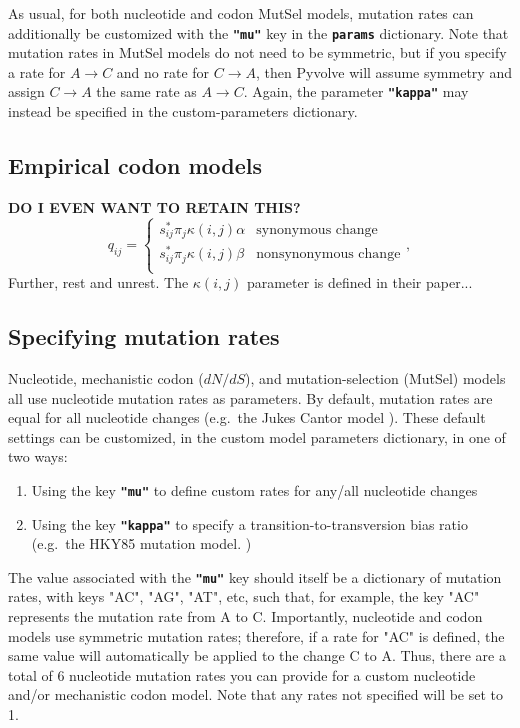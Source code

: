 \documentclass{article}
\newcommand{\code}[1]{\textbf{\texttt{\small{#1}}}}
\begin{document}
As usual, for both nucleotide and codon MutSel models, mutation rates can additionally be customized with the \code{"mu"} key in the \code{params} dictionary. Note that mutation rates in MutSel models do not need to be symmetric, but if you specify a rate for $A \rightarrow C$ and no rate for $C \rightarrow A$, then Pyvolve will assume symmetry and assign $C \rightarrow A$ the same rate as $A \rightarrow C$. Again, the parameter \code{"kappa"} may instead be specified in the custom-parameters dictionary.


\subsection{Empirical codon models}\label{sec:ecm_basic}
\textbf{DO I EVEN WANT TO RETAIN THIS?}
\begin{equation}\label{eq:ecmrest}
q_{ij} = \left\{ 
\begin{array}{rl}
s^\ast_{ij} \pi_j \kappa(i,j) \alpha      &\text{synonymous change} \\
s^\ast_{ij} \pi_j \kappa(i,j) \beta       &\text{nonsynonymous change} \\
\end{array} \right.,
\end{equation}
Further, rest and unrest. The $\kappa(i,j)$ parameter is defined in their paper...

\subsection{Specifying mutation rates}\label{sec:mu}

Nucleotide, mechanistic codon ($dN/dS$), and mutation-selection (MutSel) models all use nucleotide mutation rates as parameters. By default, mutation rates are equal for all nucleotide changes (e.g.\ the Jukes Cantor model \citep{JC69}). These default settings can be customized, in the custom model parameters dictionary, in one of two ways:
\begin{enumerate}
	\item Using the key \code{"mu"} to define custom rates for any/all nucleotide changes
	\item Using the key \code{"kappa"} to specify a transition-to-transversion bias ratio (e.g.\ the HKY85 mutation model. \citep{HKY85})
\end{enumerate}
The value associated with the \code{"mu"} key should itself be a dictionary of mutation rates, with keys "AC", "AG", "AT", etc, such that, for example, the key "AC" represents the mutation rate from A to C. Importantly, nucleotide and codon models use symmetric mutation rates; therefore, if a rate for "AC" is defined, the same value will automatically be applied to the change C to A. Thus, there are a total of 6 nucleotide mutation rates you can provide for a custom nucleotide and/or mechanistic codon model. Note that any rates not specified will be set to 1.
\end{document}
